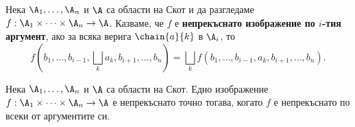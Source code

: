 
Нека $\A_1,\dots,\A_n$ и $\A$ са области на Скот и да разгледаме $f: \A_1\times \dots \times \A_n \to \A$.
Казваме, че $f$ е {\bf непрекъснато изображение по $i$-тия аргумент}, ако 
за всяка верига $\chain{a}{k}$ в $\A_i$, то
\[f(b_1,\dots, b_{i-1}, \bigsqcup_k a_k, b_{i+1},\dots,b_n) = \bigsqcup_kf(b_1,\dots, b_{i-1}, a_k, b_{i+1},\dots,b_n).\]

\begin{proposition}
  Нека $\A_1,\dots,\A_n$ и $\A$ са области на Скот.
  Едно изображение $f: \A_1\times \dots \times \A_n \to \A$ 
  е непрекъснато точно тогава, когато $f$ е непрекъснато по всеки от аргументите си.
\end{proposition}

